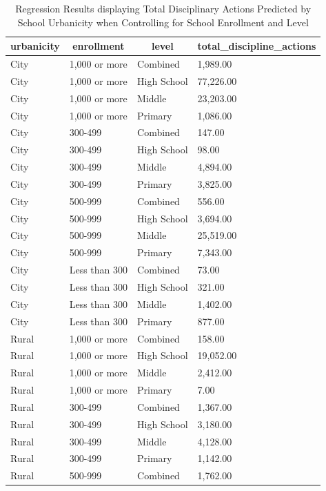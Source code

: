 \documentclass[
  man, fleqn, noextraspace]{apa6}
\begin{document}
\begin{table}[tbp]
\begin{center}
\begin{threeparttable}
\caption{\label{tab:model tables}Regression Results displaying Total Disciplinary Actions Predicted by School Urbanicity when Controlling for School Enrollment and Level}
\begin{tabular}{llll}
\toprule
urbanicity & \multicolumn{1}{c}{enrollment} & \multicolumn{1}{c}{level} & \multicolumn{1}{c}{total\_discipline\_actions}\\
\midrule
City & 1,000 or more & Combined & 1,989.00\\
City & 1,000 or more & High School & 77,226.00\\
City & 1,000 or more & Middle & 23,203.00\\
City & 1,000 or more & Primary & 1,086.00\\
City & 300-499 & Combined & 147.00\\
City & 300-499 & High School & 98.00\\
City & 300-499 & Middle & 4,894.00\\
City & 300-499 & Primary & 3,825.00\\
City & 500-999 & Combined & 556.00\\
City & 500-999 & High School & 3,694.00\\
City & 500-999 & Middle & 25,519.00\\
City & 500-999 & Primary & 7,343.00\\
City & Less than 300 & Combined & 73.00\\
City & Less than 300 & High School & 321.00\\
City & Less than 300 & Middle & 1,402.00\\
City & Less than 300 & Primary & 877.00\\
Rural & 1,000 or more & Combined & 158.00\\
Rural & 1,000 or more & High School & 19,052.00\\
Rural & 1,000 or more & Middle & 2,412.00\\
Rural & 1,000 or more & Primary & 7.00\\
Rural & 300-499 & Combined & 1,367.00\\
Rural & 300-499 & High School & 3,180.00\\
Rural & 300-499 & Middle & 4,128.00\\
Rural & 300-499 & Primary & 1,142.00\\
Rural & 500-999 & Combined & 1,762.00\\

\end{tabular}
\end{threeparttable}
\end{center}
\end{table}
\end{document}
